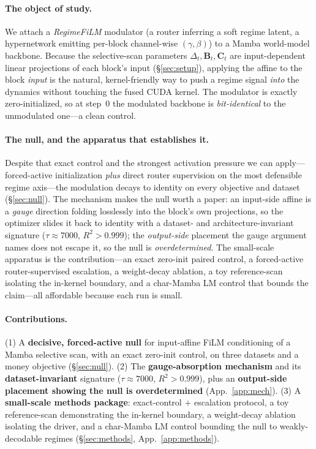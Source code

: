 \documentclass{article}
\begin{document}
\paragraph{The object of study.}
We attach a \emph{RegimeFiLM} modulator (a router inferring a soft regime latent, a
hypernetwork emitting per-block channel-wise $(\gamma,\beta)$) to a Mamba
world-model backbone. Because the selective-scan parameters
$\Delta_t,\mathbf{B}_t,\mathbf{C}_t$ are input-dependent linear projections of each
block's input (\S\ref{sec:setup}), applying the affine to the block \emph{input} is
the natural, kernel-friendly way to push a regime signal \emph{into} the dynamics
without touching the fused CUDA kernel. The modulator is exactly zero-initialized,
so at step~0 the modulated backbone is \emph{bit-identical} to the unmodulated
one---a clean control.

\paragraph{The null, and the apparatus that establishes it.}
Despite that exact control and the strongest activation pressure we can
apply---forced-active initialization \emph{plus} direct router supervision on the
most defensible regime axis---the modulation decays to identity on every objective
and dataset (\S\ref{sec:null}). The mechanism makes the null worth a paper: an
input-side affine is a \emph{gauge} direction folding losslessly into the block's
own projections, so the optimizer slides it back to identity with a dataset- and
architecture-invariant signature ($\tau\approx7000$, $R^2>0.999$); the
\emph{output-side} placement the gauge argument names does not escape it, so the
null is \emph{overdetermined}. The small-scale apparatus is the contribution---an
exact zero-init paired control, a forced-active router-supervised escalation, a
weight-decay ablation, a toy reference-scan isolating the in-kernel boundary, and a
char-Mamba LM control that bounds the claim---all affordable because each run is
small.

\paragraph{Contributions.}
(1) A \textbf{decisive, forced-active null} for input-affine FiLM conditioning of a
Mamba selective scan, with an exact zero-init control, on three datasets and a money
objective (\S\ref{sec:null}). (2) The \textbf{gauge-absorption mechanism} and its
\textbf{dataset-invariant} signature ($\tau\approx7000$, $R^2>0.999$), plus an
\textbf{output-side placement showing the null is overdetermined}
(App.~\ref{app:mech}). (3) A \textbf{small-scale methods package}: exact-control
$+$ escalation protocol, a toy reference-scan demonstrating the in-kernel boundary,
a weight-decay ablation isolating the driver, and a char-Mamba LM control bounding
the null to weakly-decodable regimes (\S\ref{sec:methods}, App.~\ref{app:methods}).
\end{document}
